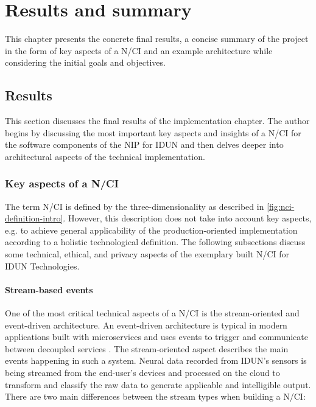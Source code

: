 \chapter{Results and summary}
\graphicspath{{Chapter5/Figs/}{Chapter5/Figs/}}

This chapter presents the concrete final results, a concise summary of the project in the form of key aspects of a N/CI and an example architecture while considering the initial goals and objectives.

\section{Results}
\label{chapter5-results}

This section discusses the final results of the implementation chapter. The author begins by discussing the most important key aspects and insights of a N/CI for the software components of the NIP for IDUN and then delves deeper into architectural aspects of the technical implementation.

\subsection{Key aspects of a N/CI}
\label{chapter5-key-aspects}

The term N/CI is defined by the three-dimensionality as described in \autoref{fig:nci-definition-intro}. However, this description does not take into account key aspects, e.g. to achieve general applicability of the production-oriented implementation according to a holistic technological definition. The following subsections discuss some technical, ethical, and privacy aspects of the exemplary built N/CI for IDUN Technologies.

\subsubsection{Stream-based events}
\label{chapter5-stream-based-events}

One of the most critical technical aspects of a N/CI is the stream-oriented and event-driven architecture. An event-driven architecture is typical in modern applications built with microservices and uses events to trigger and communicate between decoupled services \citep{amazon_web_services_inc_event-driven_nodate}. The stream-oriented aspect describes the main events happening in such a system. Neural data recorded from IDUN's sensors is being streamed from the end-user's devices and processed on the cloud to transform and classify the raw data to generate applicable and intelligible output. There are two main differences between the stream types when building a N/CI:

